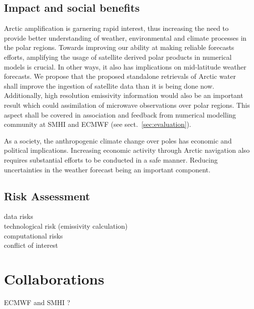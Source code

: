 \documentclass[12pt,oneside,a4paper]{article}
\begin{document}

\subsection{Impact and social benefits}
%
\label{sec:impact}
Arctic amplification is garnering rapid interest, thus increasing the need to provide better understanding of weather, environmental and climate processes in the polar regions. Towards improving our ability at making reliable forecasts efforts, amplifying the usage of satellite derived polar products in numerical models is crucial. In other ways, it also has implications on mid-latitude weather forecasts. We propose that the proposed standalone retrievals of Arctic water shall improve the ingestion of satellite data than it is being done now. Additionally, high resolution emissivity information would also be an important result which could assimilation of microwave observations over polar regions. This aspect shall be covered in association and feedback from numerical modelling community at SMHI and ECMWF (see sect.~\ref{sec:evaluation}).

As a society, the anthropogenic climate change over poles has economic and political implications. Increasing economic activity through Arctic navigation also requires substantial efforts to be conducted in a safe manner. Reducing uncertainties in the weather forecast being an important component. 

 
\subsection{Risk Assessment}
%
\label{sec:risk}
data risks\\
technological risk (emissivity calculation)\\
computational risks\\
conflict of interest  

\section{Collaborations}
ECMWF and SMHI ?
\end{document}
